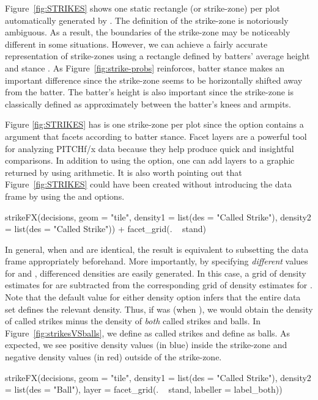 \begin{article}
Figure~\ref{fig:STRIKES} shows one static rectangle (or strike-zone)
per plot automatically generated by . The definition
of the strike-zone is notoriously ambiguous. As a result, the boundaries
of the strike-zone may be noticeably different in some situations.
However, we can achieve a fairly accurate representation of strike-zones
using a rectangle defined by batters' average height and stance \citep{Strikezones}.
As Figure~\ref{fig:strike-probs} reinforces, batter stance makes
an important difference since the strike-zone seems to be horizontally
shifted away from the batter. The batter's height is also important
since the strike-zone is classically defined as approximately between
the batter's knees and armpits.

Figure \ref{fig:STRIKES} has is one strike-zone per plot since the
 option contains a  argument that facets
according to batter stance. Facet layers are a powerful tool for analyzing
PITCHf/x data because they help produce quick and insightful comparisons.
In addition to using the  option, one can add layers
to a graphic returned by  using  arithmetic.
It is also worth pointing out that Figure~\ref{fig:STRIKES} could
have been created without introducing the  data frame
by using the  and  options. 
%
\begin{Schunk}
\begin{Sinput}
strikeFX(decisions, geom = "tile", density1 = list(des = "Called Strike"), 
  density2 = list(des = "Called Strike")) + facet_grid(. ~ stand) 
\end{Sinput}
\end{Schunk}
%
In general, when  and  are identical,
the result is equivalent to subsetting the data frame appropriately
beforehand. More importantly, by specifying \emph{different} values
for  and , differenced densities are
easily generated. In this case, a grid of density estimates for 
are subtracted from the corresponding grid of density estimates for
. Note that the default  value for either
density option infers that the entire data set defines the relevant
density. Thus, if  was  (when ),
we would obtain the density of called strikes minus the density of
\emph{both} called strikes and balls. In Figure~\ref{fig:strikesVSballs},
we define  as called strikes and define 
as balls. As expected, we see positive density values (in blue) inside
the strike-zone and negative density values (in red) outside of the
strike-zone. 
%
\begin{Schunk}
\begin{Sinput}
strikeFX(decisions, geom = "tile", density1 = list(des = "Called Strike"), 
  density2 = list(des = "Ball"), layer = facet_grid(. ~ stand, labeller = label_both)) 
\end{Sinput}
\end{Schunk}


\end{article}
